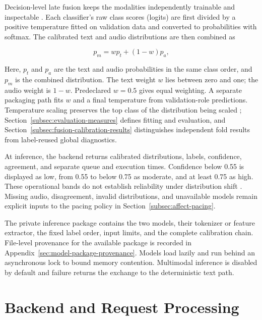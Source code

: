 Decision-level late fusion keeps the modalities independently trainable and inspectable \cite{baltrusaitis2019multimodal}. Each classifier's raw class scores (logits) are first divided by a positive temperature fitted on validation data and converted to probabilities with softmax. The calibrated text and audio distributions are then combined as

\begin{equation}
 p_m = w p_t + (1-w)p_a,
 \label{eq:implementation-late-fusion}
\end{equation}

Here, $p_t$ and $p_a$ are the text and audio probabilities in the same class order, and $p_m$ is the combined distribution. The text weight $w$ lies between zero and one; the audio weight is $1-w$. Predeclared $w=0.5$ gives equal weighting. A separate packaging path fits $w$ and a final temperature from validation-role predictions. Temperature scaling preserves the top class of the distribution being scaled \cite{guo2017calibration}; Section~\ref{subsec:evaluation-measures} defines fitting and evaluation, and Section~\ref{subsec:fusion-calibration-results} distinguishes independent fold results from label-reused global diagnostics.
\label{subsec:multimodal-late-fusion}
\label{subsec:confidence-calibration-uncertainty}

At inference, the backend returns calibrated distributions, labels, confidence, agreement, and separate queue and execution times. Confidence below 0.55 is displayed as low, from 0.55 to below 0.75 as moderate, and at least 0.75 as high. These operational bands do not establish reliability under distribution shift \cite{ovadia2019shift}. Missing audio, disagreement, invalid distributions, and unavailable models remain explicit inputs to the pacing policy in Section~\ref{subsec:affect-pacing}.

The private inference package contains the two models, their tokenizer or feature extractor, the fixed label order, input limits, and the complete calibration chain. File-level provenance for the available package is recorded in Appendix~\ref{sec:model-package-provenance}. Models load lazily and run behind an asynchronous lock to bound memory contention. Multimodal inference is disabled by default and failure returns the exchange to the deterministic text path.
\label{subsec:model-artefacts-provenance}
\label{subsec:reproducibility-provenance}

\section{Backend and Request Processing}
\label{sec:backend-application}

